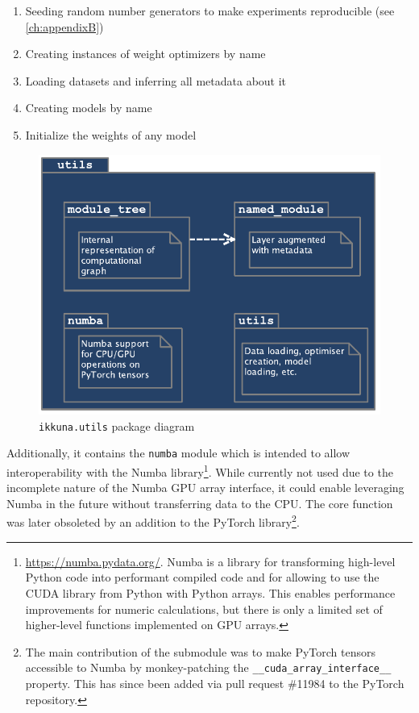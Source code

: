 \begin{enumerate}
    \item
        Seeding random number generators to make experiments reproducible (see
        \cref{ch:appendixB})
    \item
        Creating instances of weight optimizers by name
    \item
        Loading datasets and inferring all metadata about it
    \item
        Creating models by name
    \item
        Initialize the weights of any model
\end{enumerate}

\begin{figure}
    \hypertarget{fig:pack-diag-utils}{%
        \centering
        \includegraphics[max width=.7\textwidth]{gfx/diagrams/class_diagrams/utils_package_diagram.pdf}
        \caption{\texttt{ikkuna.utils} package diagram}\label{fig:pack-diag-utils}
    }
\end{figure}

Additionally, it contains the \texttt{numba} module
which is intended to allow interoperability with the Numba
library\footnote{\url{https://numba.pydata.org/}. Numba is a library for
    transforming high-level Python code into performant compiled code and
    for allowing to use the CUDA library from Python with Python arrays.
    This enables performance improvements for numeric calculations, but
    there is only a limited set of higher-level functions implemented on
GPU arrays.}. While currently not used due to the incomplete nature of
the Numba GPU array interface, it could enable leveraging Numba in the
future without transferring data to the CPU. The core function was later
obsoleted by an addition to the PyTorch library\footnote{The main contribution
of the submodule was to make PyTorch tensors accessible to Numba by
monkey-patching the \lstinline{__cuda_array_interface__} property. This has since
been added via pull request \#11984 to the PyTorch repository.}.

